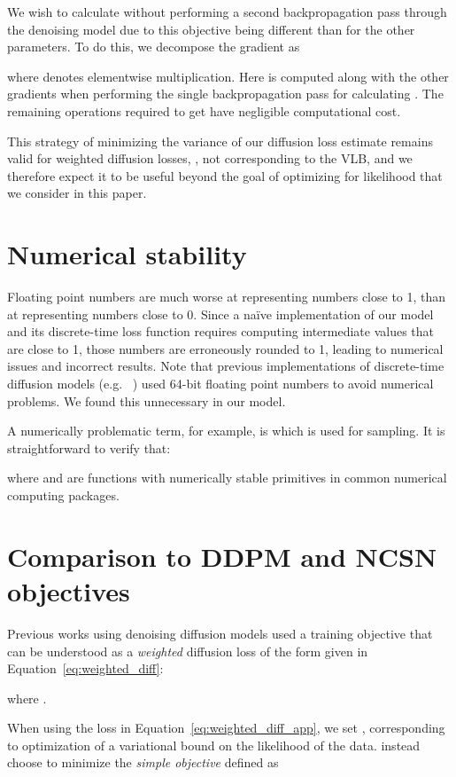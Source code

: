 \documentclass{article}
\def\Eqref#1{Equation~\ref{#1}}
\begin{document}
We wish to calculate  without performing a second backpropagation pass through the denoising model due to this objective being different than for the other parameters. To do this, we decompose the gradient as

where  denotes elementwise multiplication.
Here  is computed along with the other gradients when performing the single backpropagation pass for calculating . The remaining operations required to get  have negligible computational cost.

This strategy of minimizing the variance of our diffusion loss estimate remains valid for weighted diffusion losses, , not corresponding to the VLB, and we therefore expect it to be useful beyond the goal of optimizing for likelihood that we consider in this paper.

\section{Numerical stability}
\label{sec:stable}

Floating point numbers are much worse at representing numbers close to 1, than at representing numbers close to 0. Since a na\"ive implementation of our model and its discrete-time loss function requires computing intermediate values that are close to 1, those numbers are erroneously rounded to 1, leading to numerical issues and incorrect results. Note that previous implementations of discrete-time diffusion models (e.g. ~\citep{ho2020denoising}) used 64-bit floating point numbers to avoid numerical problems. We found this unnecessary in our model.

A numerically problematic term, for example, is  which is used for sampling. It is straightforward to verify that:

where  and  are functions with numerically stable primitives in common numerical computing packages. 

\section{Comparison to DDPM and NCSN objectives}
\label{sec:ncsn_ddpm_weights}
Previous works using denoising diffusion models \citep{ho2020denoising, song2019generative, nichol2021improved} used a training objective that can be understood as a \emph{weighted} diffusion loss of the form given in \Eqref{eq:weighted_diff}:

where .

When using the loss in \Eqref{eq:weighted_diff_app}, we set , corresponding to optimization of a variational bound on the likelihood of the data. \cite{ho2020denoising, song2019generative,nichol2021improved} instead choose to minimize the \emph{simple objective} defined as
\end{document}
